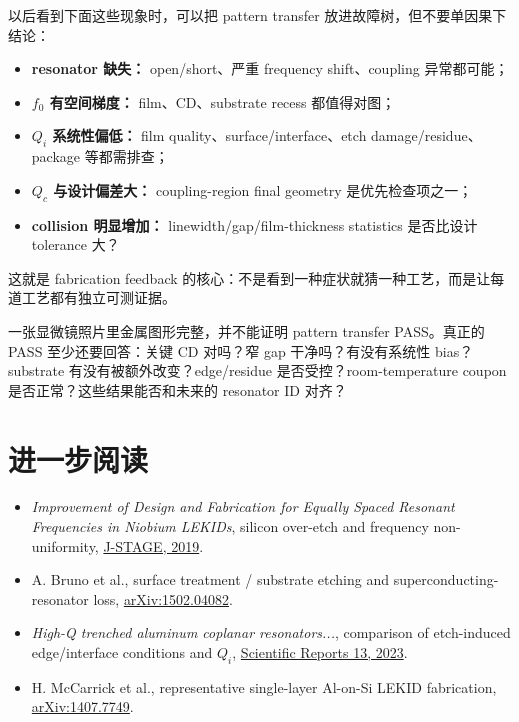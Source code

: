 以后看到下面这些现象时，可以把 pattern transfer 放进故障树，但不要单因果下结论：

\begin{itemize}
  \item \textbf{resonator 缺失：} open/short、严重 frequency shift、coupling 异常都可能；
  \item \textbf{$f_0$ 有空间梯度：} film、CD、substrate recess 都值得对图；
  \item \textbf{$Q_i$ 系统性偏低：} film quality、surface/interface、etch damage/residue、package 等都需排查；
  \item \textbf{$Q_c$ 与设计偏差大：} coupling-region final geometry 是优先检查项之一；
  \item \textbf{collision 明显增加：} linewidth/gap/film-thickness statistics 是否比设计 tolerance 大？
\end{itemize}

这就是 fabrication feedback 的核心：不是看到一种症状就猜一种工艺，而是让每道工艺都有独立可测证据。

\begin{checkpointbox}
一张显微镜照片里金属图形完整，并不能证明 pattern transfer PASS。真正的 PASS 至少还要回答：关键 CD 对吗？窄 gap 干净吗？有没有系统性 bias？substrate 有没有被额外改变？edge/residue 是否受控？room-temperature coupon 是否正常？这些结果能否和未来的 resonator ID 对齐？
\end{checkpointbox}

\section*{进一步阅读}

\begin{itemize}
  \item \textit{Improvement of Design and Fabrication for Equally Spaced Resonant Frequencies in Niobium LEKIDs}, silicon over-etch and frequency non-uniformity, \href{https://www.jstage.jst.go.jp/article/jcsj/54/1/54_33/_article/-char/en}{J-STAGE, 2019}.
  \item A. Bruno et al., surface treatment / substrate etching and superconducting-resonator loss, \href{https://arxiv.org/abs/1502.04082}{arXiv:1502.04082}.
  \item \textit{High-Q trenched aluminum coplanar resonators...}, comparison of etch-induced edge/interface conditions and $Q_i$, \href{https://www.nature.com/articles/s41598-023-42332-6}{Scientific Reports 13, 2023}.
  \item H. McCarrick et al., representative single-layer Al-on-Si LEKID fabrication, \href{https://arxiv.org/abs/1407.7749}{arXiv:1407.7749}.
\end{itemize}
